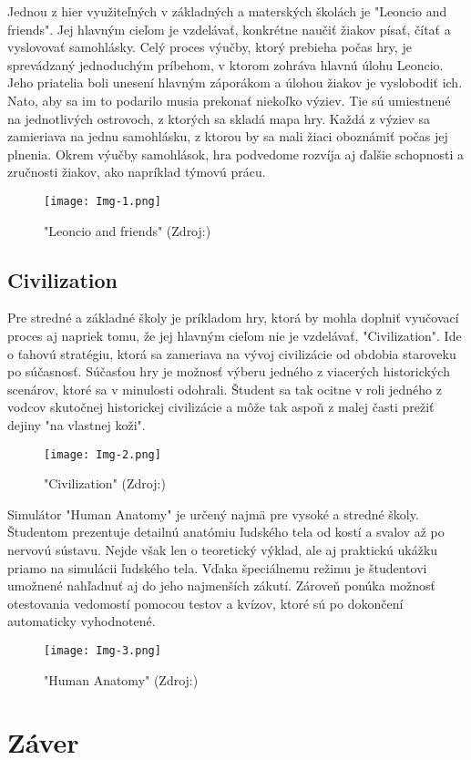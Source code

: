 \documentclass[10pt,twoside,slovak,a4paper]{article}
\begin{document}
Jednou z hier využiteľných v základných a materských školách je "Leoncio and friends"\cite{Zea2009-eh}. Jej hlavným cieľom je vzdelávať, konkrétne naučiť žiakov písať, čítať a vyslovovať samohlásky. Celý proces výučby, ktorý prebieha počas hry, je sprevádzaný jednoduchým príbehom, v ktorom zohráva hlavnú úlohu Leoncio. Jeho priatelia boli unesení hlavným záporákom a úlohou žiakov je vyslobodiť ich. Nato, aby sa im to podarilo musia prekonať niekoľko výziev. Tie sú umiestnené na jednotlivých ostrovoch, z ktorých sa skladá mapa hry. Každá z výziev sa zamieriava na jednu samohlásku, z ktorou by sa mali žiaci oboznámiť počas jej plnenia. Okrem výučby samohlások, hra podvedome rozvíja aj ďalšie schopnosti a zručnosti žiakov, ako napríklad týmovú prácu.

\begin{figure}[tbh]
	\centering
	\texttt{[image: Img-1.png]}
	\caption{"Leoncio and friends" (Zdroj:\cite{Zea2009-eh})}
	\label{obr-1}
\end{figure}

\subsection{Civilization} \label{hra-2}

Pre stredné a základné školy je príkladom hry, ktorá by mohla doplniť vyučovací proces aj napriek tomu, že jej hlavným cieľom nie je vzdelávať, "Civilization"\cite{Civil}. Ide o ťahovú stratégiu, ktorá sa zameriava na vývoj civilizácie od obdobia staroveku po súčasnosť. Súčasťou hry je možnosť výberu jedného z viacerých historických scenárov, ktoré sa v minulosti odohrali. Študent sa tak ocitne v roli jedného z vodcov skutočnej historickej civilizácie a môže tak aspoň z malej časti prežiť dejiny "na vlastnej koži".

\begin{figure}[tbh]
	\centering
	\texttt{[image: Img-2.png]}
	\caption{"Civilization" (Zdroj:\cite{Img-Civil})}
	\label{obr-2}
\end{figure}

Simulátor "Human Anatomy"\cite{Antom} je určený najmä pre vysoké a stredné školy. Študentom prezentuje detailnú anatómiu ľudského tela od kostí a svalov až po nervovú sústavu. Nejde však len o teoretický výklad, ale aj praktickú ukážku priamo na simulácii ľudského tela. Vďaka špeciálnemu režimu je študentovi umožnené nahľadnuť aj do jeho najmenších zákutí. Zároveň ponúka možnosť otestovania vedomostí pomocou testov a kvízov, ktoré sú po dokončení automaticky vyhodnotené.

\begin{figure}[tbh]
	\centering
	\texttt{[image: Img-3.png]}
	\caption{"Human Anatomy" (Zdroj:\cite{Img-Antom})}
	\label{obr-3}
\end{figure}

\section{Záver}



\end{document}
